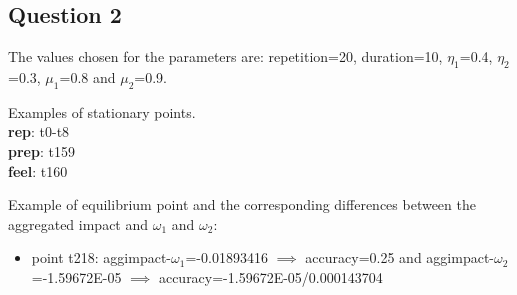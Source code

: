 \documentclass[a4paper]{article}
\begin{document}
\subsection{Question 2}

The values chosen for the parameters are: repetition=20, duration=10, $\eta_{1}$=0.4, $\eta_{2}$=0.3, $\mu_{1}$=0.8 and $\mu_{2}$=0.9.

Examples of stationary points. \\
\textbf{rep}: t0-t8 \\
\textbf{prep}: t159 	\\
\textbf{feel}: t160

Example of equilibrium point and the corresponding differences between the aggregated impact and $\omega_{1}$ and $\omega_{2}$:
\begin{itemize}
\item point t218: aggimpact-$\omega_{1}$=-0.01893416 $\implies$ accuracy=0.25 and aggimpact-$\omega_{2}$=-1.59672E-05 $\implies$ accuracy=-1.59672E-05/0.000143704
\end{itemize} 
\end{document}
